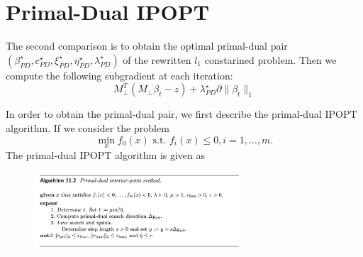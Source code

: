 \documentclass{article}
\begin{document}
\section{Primal-Dual IPOPT}
The second comparison is to obtain the optimal primal-dual pair $(\beta_{PD}^\star, c_{PD}^\star, \xi_{PD}^\star, \eta_{PD}^\star, \lambda_{PD}^\star)$ of the rewritten $l_1$ constarined problem. Then we compute the following subgradient at each iteration:
\begin{equation}
    M_{\perp}^T(M_{\perp}\beta_t-z) + \lambda_{PD}^\star \partial \|\beta_t\|_1
\end{equation}

In order to obtain the primal-dual pair, we first describe the primal-dual IPOPT algorithm. If we consider the problem
\begin{equation}
    \min_x f_0(x) \text{ s.t. } f_i(x)\leq 0, i=1,\dots,m.
\end{equation}
The primal-dual IPOPT algorithm is given as
\begin{figure}[H]
	\centering	\includegraphics[width=0.7\textwidth]{PDIPOPT.png} 
\end{figure}
\end{document}
